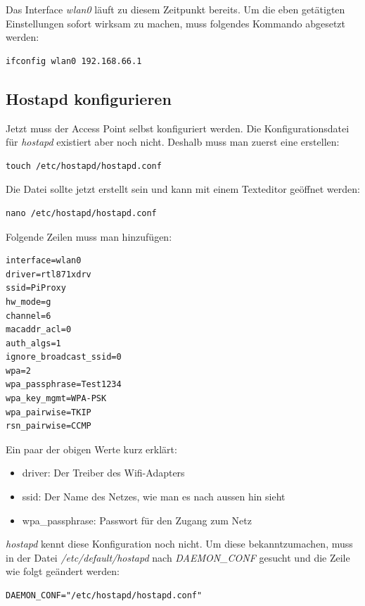 Das Interface \textit{wlan0} läuft zu diesem Zeitpunkt bereits. Um die eben getätigten Einstellungen sofort wirksam zu machen, muss folgendes Kommando abgesetzt werden:

\begin{lstlisting}
ifconfig wlan0 192.168.66.1
\end{lstlisting}

\subsection{Hostapd konfigurieren}
Jetzt muss der Access Point selbst konfiguriert werden. Die Konfigurationsdatei für \textit{hostapd} existiert aber noch nicht. Deshalb muss man zuerst eine erstellen:

\begin{lstlisting}
touch /etc/hostapd/hostapd.conf
\end{lstlisting}

Die Datei sollte jetzt erstellt sein und kann mit einem Texteditor geöffnet werden:

\begin{lstlisting}
nano /etc/hostapd/hostapd.conf
\end{lstlisting}

Folgende Zeilen muss man hinzufügen:

\begin{lstlisting}
interface=wlan0
driver=rtl871xdrv
ssid=PiProxy
hw_mode=g
channel=6
macaddr_acl=0
auth_algs=1
ignore_broadcast_ssid=0
wpa=2
wpa_passphrase=Test1234
wpa_key_mgmt=WPA-PSK
wpa_pairwise=TKIP
rsn_pairwise=CCMP
\end{lstlisting}

Ein paar der obigen Werte kurz erklärt: 
\begin{itemize}
\item driver: Der Treiber des Wifi-Adapters
\item ssid: Der Name des Netzes, wie man es nach aussen hin sieht
\item wpa\_passphrase: Passwort für den Zugang zum Netz
\end{itemize}

\textit{hostapd} kennt diese Konfiguration noch nicht. Um diese bekanntzumachen, muss in der Datei \textit{/etc/default/hostapd} nach \textit{DAEMON\_CONF} gesucht und die Zeile wie folgt geändert werden:

\begin{lstlisting}
DAEMON_CONF="/etc/hostapd/hostapd.conf"
\end{lstlisting}

